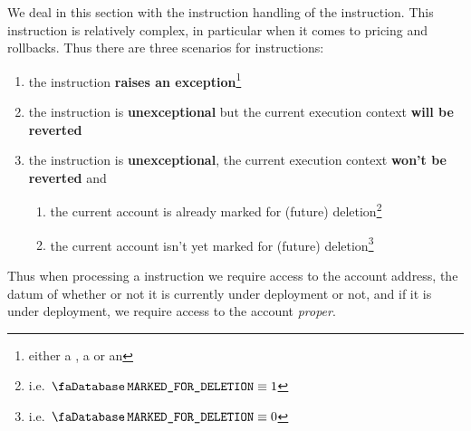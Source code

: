 We deal in this section with the instruction handling of the  instruction. 
This instruction is relatively complex, in particular when it comes to pricing and rollbacks.
Thus there are three scenarios for  instructions:
\begin{enumerate}
	\item the instruction \textbf{raises an exception}\footnote{either a \suxSH{}, a \staticxSH{} or an \oogxSH{}}
        \item the instruction is \textbf{unexceptional} but the current execution context \textbf{will be reverted}
        \item the instruction is \textbf{unexceptional}, the current execution context \textbf{won't be reverted} and
		\begin{enumerate}
			\item  the current account is already marked for (future) deletion\footnote{i.e. $\accMarkedForDeletion \equiv 1$}
			\item  the current account isn't yet  marked for (future) deletion\footnote{i.e. $\accMarkedForDeletion \equiv 0$}
		\end{enumerate}
\end{enumerate}
Thus when processing a  instruction we require access to the account address, the datum of whether or not it is currently under deployment or not, and if it is under deployment, we require access to the account \emph{proper}.
